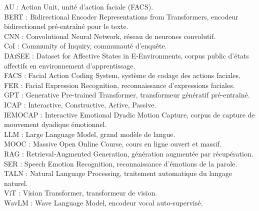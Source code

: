 \thispagestyle{plain}

\vspace*{1.2cm}
\vspace{1.1em}

\noindent
AU : Action Unit, unité d'action faciale (FACS).\\[0.45em]
BERT : Bidirectional Encoder Representations from Transformers,
  encodeur bidirectionnel pré-entraîné pour le texte.\\[0.45em]
CNN : Convolutional Neural Network, réseau de neurones convolutif.\\[0.45em]
CoI : Community of Inquiry, communauté d'enquête.\\[0.45em]
\textsc{DAiSEE} : Dataset for Affective States in E-Environments,
  corpus public d'états affectifs en environnement d'apprentissage.\\[0.45em]
FACS : Facial Action Coding System, système de codage des actions faciales.\\[0.45em]
FER : Facial Expression Recognition, reconnaissance d'expressions faciales.\\[0.45em]
GPT : Generative Pre-trained Transformer, transformeur génératif pré-entraîné.\\[0.45em]
ICAP : Interactive, Constructive, Active, Passive.\\[0.45em]
\textsc{IEMOCAP} : Interactive Emotional Dyadic Motion Capture,
  corpus de capture de mouvement dyadique émotionnel.\\[0.45em]
LLM : Large Language Model, grand modèle de langue.\\[0.45em]
MOOC : Massive Open Online Course, cours en ligne ouvert et massif.\\[0.45em]
RAG : Retrieval-Augmented Generation, génération augmentée par récupération.\\[0.45em]
SER : Speech Emotion Recognition, reconnaissance d'émotions de la parole.\\[0.45em]
TALN : Natural Language Processing, traitement automatique du langage naturel.\\[0.45em]
ViT : Vision Transformer, transformeur de vision.\\[0.45em]
WavLM : Wave Language Model, encodeur vocal auto-supervisé.
